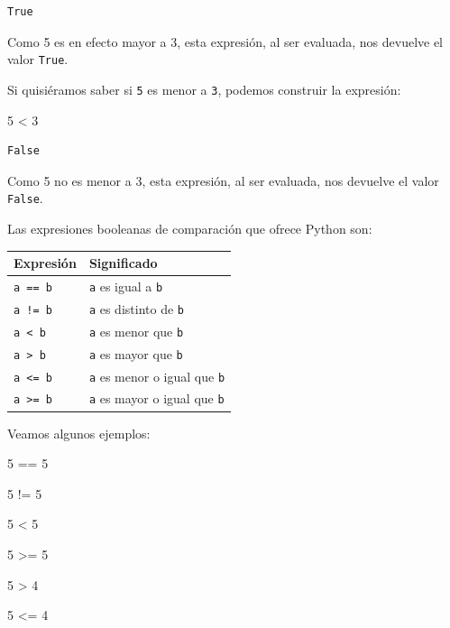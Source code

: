 \documentclass[
  letterpaper,
  DIV=11,
  numbers=noendperiod]{scrreprt}
\newenvironment{Shaded}{\begin{snugshade}}{\end{snugshade}}
\newcommand{\DecValTok}[1]{\textcolor[rgb]{0.68,0.00,0.00}{#1}}
\newcommand{\OperatorTok}[1]{\textcolor[rgb]{0.37,0.37,0.37}{#1}}
\begin{document}
\begin{verbatim}
True
\end{verbatim}

Como 5 es en efecto mayor a 3, esta expresión, al ser evaluada, nos
devuelve el valor \texttt{True}.

Si quisiéramos saber si \texttt{5} es menor a \texttt{3}, podemos
construir la expresión:

\begin{Shaded}
\begin{Highlighting}[]
\DecValTok{5} \OperatorTok{\textless{}} \DecValTok{3}
\end{Highlighting}
\end{Shaded}

\begin{verbatim}
False
\end{verbatim}

Como 5 no es menor a 3, esta expresión, al ser evaluada, nos devuelve el
valor \texttt{False}.

Las expresiones booleanas de comparación que ofrece Python son:

\begin{longtable}[]{@{}ll@{}}
\toprule\noalign{}
Expresión & Significado \\
\midrule\noalign{}
\endhead
\bottomrule\noalign{}
\endlastfoot
\texttt{a\ ==\ b} & \texttt{a} es igual a \texttt{b} \\
\texttt{a\ !=\ b} & \texttt{a} es distinto de \texttt{b} \\
\texttt{a\ \textless{}\ b} & \texttt{a} es menor que \texttt{b} \\
\texttt{a\ \textgreater{}\ b} & \texttt{a} es mayor que \texttt{b} \\
\texttt{a\ \textless{}=\ b} & \texttt{a} es menor o igual que
\texttt{b} \\
\texttt{a\ \textgreater{}=\ b} & \texttt{a} es mayor o igual que
\texttt{b} \\
\end{longtable}

Veamos algunos ejemplos:

\begin{Shaded}
\begin{Highlighting}[]
\DecValTok{5} \OperatorTok{==} \DecValTok{5}

\DecValTok{5} \OperatorTok{!=} \DecValTok{5}

\DecValTok{5} \OperatorTok{\textless{}} \DecValTok{5}

\DecValTok{5} \OperatorTok{\textgreater{}=} \DecValTok{5}

\DecValTok{5} \OperatorTok{\textgreater{}} \DecValTok{4}

\DecValTok{5} \OperatorTok{\textless{}=} \DecValTok{4}
\end{Highlighting}
\end{Shaded}
\end{document}
